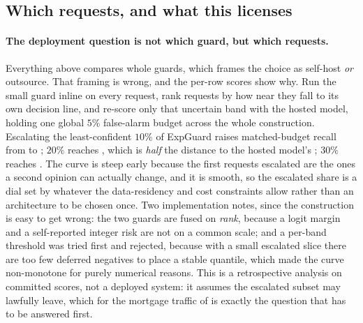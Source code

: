 \documentclass[11pt]{article}
\begin{document}
\subsection{Which requests, and what this licenses}
\label{sec:frontier-licenses}
\paragraph{The deployment question is not which guard, but which requests.} Everything above
compares whole guards, which frames the choice as self-host \emph{or} outsource. That framing
is wrong, and the per-row scores show why. Run the small guard inline on every request, rank
requests by how near they fall to its own decision line, and re-score only that uncertain band
with the hosted model, holding one global $5\%$ false-alarm budget across the whole
construction. Escalating the least-confident $10\%$ of ExpGuard raises matched-budget recall
from \CascadeLocalOnly{} to \CascadeTen{}; $20\%$ reaches \CascadeTwenty{}, which is
\emph{half} the distance to the hosted model's \FrontierBestTpr; $30\%$ reaches
\CascadeThirty{}. The curve is steep early because the
first requests escalated are the ones a second opinion can actually change, and it is smooth,
so the escalated share is a dial set by whatever the data-residency and cost constraints
allow rather than an architecture to be chosen once. Two implementation notes, since the
construction is easy to get wrong: the two guards are fused on \emph{rank}, because a logit
margin and a self-reported integer risk are not on a common scale; and a per-band threshold
was tried first and rejected, because with a small escalated slice there are too few deferred
negatives to place a stable quantile, which made the curve non-monotone for purely numerical
reasons. This is a retrospective analysis on committed scores, not a deployed system: it
assumes the escalated subset may lawfully leave, which for the mortgage traffic of
 is exactly the question that has to be answered first.
\end{document}
